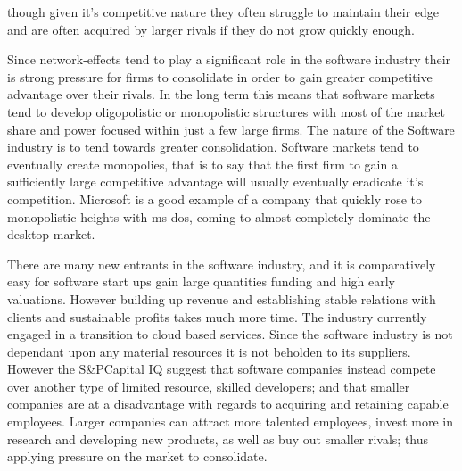 though given it's competitive nature they often struggle to maintain their edge and are often acquired by larger rivals if they do not grow quickly enough.\autocite[]{ValuelineOverview}

Since network-effects tend to play a significant role in the software industry their is strong pressure for firms to consolidate in order to gain greater competitive advantage over their rivals.\autocite[422]{schief2013mergers}
In the long term this means that software markets tend to develop oligopolistic or monopolistic structures with most of the market share and power focused within just a few large firms.\autocite[422]{schief2013mergers}
The nature of the Software industry is to tend towards greater consolidation.\autocite[]{LargeParadigmShiftCloudComputing}
Software markets tend to eventually create monopolies, that is to say that the first firm to gain a sufficiently large competitive advantage will usually eventually eradicate it's competition.\autocite[4]{buxmann2012software}
Microsoft is a good example of a company that quickly rose to monopolistic heights with ms-dos, coming to almost completely dominate the desktop market.\autocite[4]{buxmann2012software}

There are many new entrants in the software industry, and it is comparatively easy for software start ups gain large quantities funding and high early valuations. However building up revenue and establishing stable relations with clients and sustainable profits takes much more time.\autocite[39]{SurveysSoftware2015}
The industry currently engaged in a transition to cloud based services.\autocite[39]{SurveysSoftware2015}
Since the software industry is not dependant upon any material resources it is not beholden to its suppliers. However the S\&PCapital IQ suggest that software companies instead compete over another type of limited resource, skilled developers; and that smaller companies are at a disadvantage with regards to acquiring and retaining capable employees.\autocite[39]{SurveysSoftware2015}
Larger companies can attract more talented employees, invest more in research and developing new products, as well as buy out smaller rivals; thus applying pressure on the market to consolidate.\autocite[34]{IndustrySurveysInternet}


